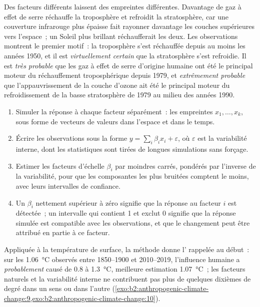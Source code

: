 Des facteurs différents laissent des empreintes différentes. Davantage de gaz à effet de serre réchauffe la troposphère
et refroidit la stratosphère, car une couverture infrarouge plus épaisse fait rayonner davantage les couches supérieures
vers l'espace~; un Soleil plus brillant réchaufferait les deux. Les observations montrent le premier motif~: la
troposphère s'est réchauffée depuis au moins les années 1950, et il est \emph{virtuellement certain} que la stratosphère
s'est refroidie. Il est \emph{très probable} que les gaz à effet de serre d'origine humaine ont été le principal moteur
du réchauffement troposphérique depuis 1979, et \emph{extrêmement probable} que l'appauvrissement de la couche d'ozone
ait été le principal moteur du refroidissement de la basse stratosphère de 1979 au milieu des années 1990.

\begin{method}\label{met:b2:anthropogenic-climate-change:fingerprinting}
\begin{enumerate}
  \item Simuler la réponse à chaque facteur séparément~: les empreintes $x_1, \dots, x_k$, sous forme
        de vecteurs de valeurs dans l'espace et dans le temps.
  \item Écrire les observations sous la forme $y = \sum_i \beta_i x_i + \varepsilon$, où $\varepsilon$ est la
        variabilité interne, dont les statistiques sont tirées de longues simulations sans forçage.
  \item Estimer les facteurs d'échelle $\beta_i$ par moindres carrés, pondérés par l'inverse de la
        variabilité, pour que les composantes les plus bruitées comptent le moins, avec leurs intervalles de confiance.
  \item Un $\beta_i$ nettement supérieur à zéro signifie que la réponse au facteur $i$ est détectée~;
        un intervalle qui contient 1 et exclut 0 signifie que la réponse simulée est compatible avec les
        observations, et que le changement peut être attribué en partie à ce facteur.
\end{enumerate}
\end{method}

Appliquée à la température de surface, la méthode donne l' rappelée au début~: sur les
\qty{1.06}{\celsius} observés entre 1850--1900 et 2010--2019, l'influence humaine a \emph{probablement}
causé de 0.8 à \qty{1.3}{\celsius}, meilleure estimation \qty{1.07}{\celsius}~; les facteurs naturels
et la variabilité interne ne contribuent pas plus de quelques dixièmes de degré dans un sens ou dans
l'autre (\cref{exo:b2:anthropogenic-climate-change:9,exo:b2:anthropogenic-climate-change:10}).

